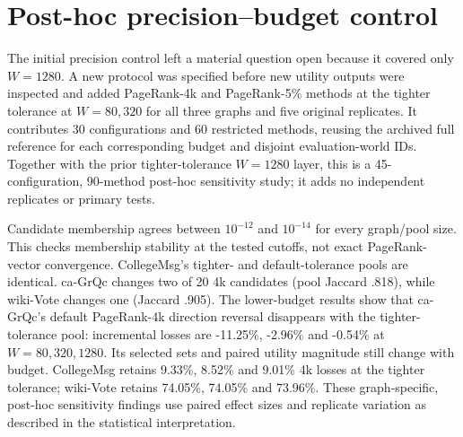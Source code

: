 \documentclass[smallextended]{svjour3}
\begin{document}
\section{Post-hoc precision--budget control}
The initial precision control left a material question open because it covered
only $W=1280$. A new protocol was specified before new utility outputs were inspected
and added PageRank-4k and PageRank-5\% methods at the tighter tolerance at $W=80,320$ for all three
graphs and five original replicates. It contributes 30 configurations and 60 restricted
methods, reusing the archived full reference for each corresponding budget and disjoint evaluation-world IDs. Together
with the prior tighter-tolerance $W=1280$ layer, this is a 45-configuration, 90-method post-hoc
sensitivity study; it adds no independent replicates or primary tests.

Candidate membership agrees between $10^{-12}$ and $10^{-14}$ for every graph/pool size. This checks membership stability at the tested cutoffs, not exact PageRank-vector convergence.
CollegeMsg's tighter- and default-tolerance pools are identical. ca-GrQc changes two of 20
4k candidates (pool Jaccard .818), while wiki-Vote changes one (Jaccard .905).
The lower-budget results show that ca-GrQc's default PageRank-4k direction reversal
disappears with the tighter-tolerance pool: incremental losses are -11.25\%, -2.96\% and
-0.54\% at $W=80,320,1280$. Its selected sets and paired utility magnitude still
change with budget. CollegeMsg retains 9.33\%, 8.52\% and 9.01\% 4k losses at the tighter tolerance;
wiki-Vote retains 74.05\%, 74.05\% and 73.96\%. These graph-specific, post-hoc sensitivity findings use paired effect sizes and replicate variation as described in the statistical interpretation.

\end{document}
